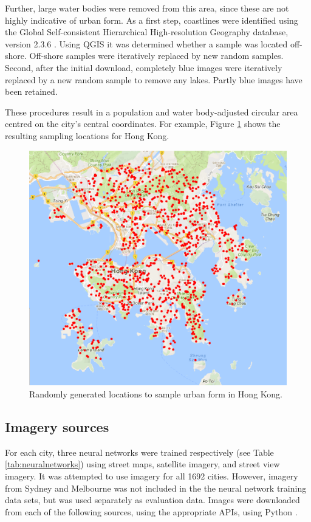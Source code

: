 \documentclass[sageh,times]{sagej}
\begin{document}
Further, large water bodies were removed from this area, since these are not highly indicative of urban form. As a first step, coastlines were identified using the Global Self-consistent Hierarchical High-resolution Geography database, version 2.3.6 \citep{Wessel1996}. Using QGIS \citep{QGIS2009} it was determined whether a sample was located off-shore. Off-shore samples were iteratively replaced by new random samples. Second, after the initial download, completely blue images were iteratively replaced by a new random sample to remove any lakes. Partly blue images have been retained.

These procedures result in a population and water body-adjusted circular area centred on the city's central coordinates. For example, Figure \ref{fig:hongkong}  shows the resulting sampling locations for Hong Kong.



\begin{figure}[!htbp] 
    \centering    
\includegraphics[scale=1]{Images/HongKong.png} 
\caption{Randomly generated locations to sample urban form in Hong Kong.} 
\label{fig:hongkong}  
\end{figure}


\label{methodsimagery}
\subsection{Imagery sources}


For each city, three neural networks were trained respectively (see Table \ref{tab:neuralnetworks}) using street maps, satellite imagery, and street view imagery. It was attempted to use imagery for all 1692 cities. However, imagery from Sydney and Melbourne was not included in the the neural network training data sets, but was used separately as evaluation data. Images were downloaded from each of the following sources, using the appropriate APIs, using Python \citep{Python2016}.
\end{document}
